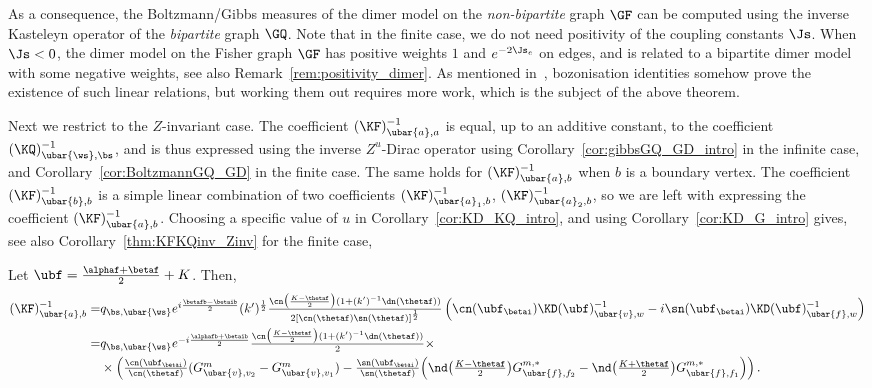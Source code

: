 \documentclass[a4paper,twoside,11pt]{article}
\begin{document}
As a consequence, the Boltzmann/Gibbs measures of the dimer model on the \emph{non-bipartite} graph $\GF$ can be computed using the inverse
Kasteleyn operator of the \emph{bipartite} graph $\GQ$. Note that in the finite case, we do not need positivity of the coupling constants $\Js$.
When $\Js<0$, the dimer model on the Fisher graph $\GF$ has positive weights $1$ and $e^{-2\Js_e}$ on edges, and 
is related to a bipartite dimer model with some negative weights, see also Remark~\ref{rem:positivity_dimer}. 
As mentioned in~\cite{Dubedat}, bozonisation identities somehow prove the existence of such linear relations, but working them out 
requires more work, which is the subject of the above theorem. 

Next we restrict to the $Z$-invariant case. The coefficient $(\KF)^{-1}_{\ubar{a},a}$ is equal, up to an additive constant, to the 
coefficient $(\KQ)^{-1}_{\ubar{\ws},\bs}$, and is thus expressed using the inverse $Z^u$-Dirac operator using 
Corollary~\ref{cor:gibbsGQ_GD_intro} in the infinite case, and Corollary~\ref{cor:BoltzmannGQ_GD} in the finite case. The same holds for
$(\KF)^{-1}_{\ubar{a},b}$ when $b$ is a boundary vertex. The coefficient $(\KF)^{-1}_{\ubar{b},b}$ is a simple linear combination of two
coefficients $(\KF)^{-1}_{\ubar{a}_1,b}$, $(\KF)^{-1}_{\ubar{a}_2,b}$, so we are left with expressing the coefficient 
$(\KF)^{-1}_{\ubar{a},b}$. Choosing a specific value of $u$ in Corollary~\ref{cor:KD_KQ_intro}, and using 
Corollary~\ref{cor:KD_G_intro} gives, see also Corollary~\ref{thm:KFKQinv_Zinv} for the finite case,
\begin{cor}\label{thm:KFKQinv_Zinv_intro}
Let $\ubf=\frac{\alphaf+\betaf}{2}+K$. Then,
\begin{align*}
\textstyle
(\KF)^{-1}_{\ubar{a},b}
=&q_{\bs,\ubar{\ws}}\textstyle e^{i\frac{\betafb-\betaib}{2}}(k')^{\frac{1}{2}}  \frac{\cn\bigl(\frac{K-\thetaf}{2}\bigr)(1+(k')^{-1}\dn(\thetaf))}{
2[\cn(\thetaf)\sn(\thetaf)]^{\frac{1}{2}}}
\left(\cn(\ubf_{\betai})\KD(\ubf)^{-1}_{\ubar{v},w}-i\sn({\ubf_{\betai}})\KD(\ubf)^{-1}_{\ubar{f},w}\right)\\
=&q_{\bs,\ubar{\ws}}\textstyle e^{-i\frac{\alphafb+\betaib}{2}} \frac{\cn\bigl(\frac{K-\thetaf}{2}\bigr)(1+(k')^{-1}\dn(\thetaf))}{
2}\times\\
&\textstyle\times \left(\frac{\cn(\ubf_{\betai})}{\cn(\thetaf)}(G^m_{\ubar{v},v_2}-G^m_{\ubar{v},v_1})
-\frac{\sn({\ubf_{\betai}})}{\sn(\thetaf)}\Bigl(\nd\bigl(\frac{K-\thetaf}{2}\bigr)G^{m,*}_{\ubar{f},f_2}-
\nd\bigl(\frac{K+\thetaf}{2}\bigr)G^{m,*}_{\ubar{f},f_1}\Bigr)\right).
\end{align*}
\end{cor}
\end{document}
